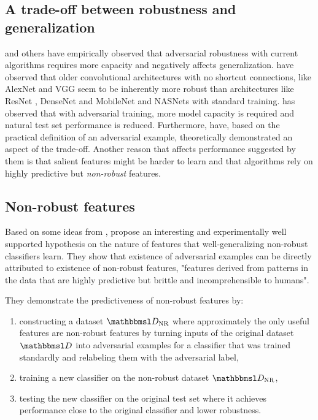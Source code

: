 \documentclass[oneside]{book}
\begin{document}
\subsection{A trade-off between robustness and generalization}

\citet{Madry:2017:TDLMRAA,Su:2017:OPAFDNN,Tsipras:2018:RMBOA} and others have empirically observed that adversarial robustness with current algorithms requires more capacity and negatively affects generalization. \citet{Su:2017:OPAFDNN} have observed that older convolutional architectures with no shortcut connections, like AlexNet \citep{Krizhevsky:2012:ICDCNN} and VGG \citep{Simonyan:2014:VDCNLSIR} seem to be inherently more robust than architectures like ResNet \citep{He:2015:DRLIR}, DenseNet \citep{Huang:2016:DCCN} and MobileNet \citep{Howard:2017:MECNNMVA} and NASNets \citep{Zoph:2018:LTASIR} with standard training. \citet{Madry:2017:TDLMRAA} has observed that with adversarial training, more model capacity is required and natural test set performance is reduced. Furthermore, \citet{Tsipras:2018:RMBOA} have, based on the practical definition of an adversarial example, theoretically demonstrated an aspect of the trade-off. Another reason that affects performance suggested by them is that salient features might be harder to learn and that algorithms rely on highly predictive but \textit{non-robust} features.

\subsection{Non-robust features}

Based on some ideas from \citet{Tsipras:2018:RMBOA},  \citet{Ilyas:2019:AENBTF} propose an interesting and experimentally well supported hypothesis on the nature of features that well-generalizing non-robust classifiers learn. They show that existence of adversarial examples can be directly attributed to existence of  non-robust features, "features derived from patterns in the data that are highly predictive but brittle and incomprehensible to humans". 

They demonstrate the predictiveness of non-robust features by: 
\begin{enumerate}
	\item constructing a dataset $\set D_\text{NR}$ where approximately the only useful features are non-robust features by turning inputs of the original dataset $\set D$ into adversarial examples for a classifier that was trained standardly and relabeling them with the adversarial label,
	\item training a new classifier on the non-robust dataset $\set D_\text{NR}$,
	\item testing the new classifier on the original test set where it achieves performance close to the original classifier and lower robustness.
\end{enumerate}
\end{document}
